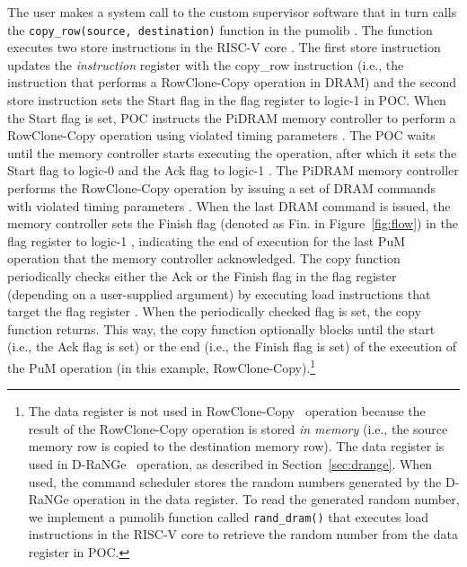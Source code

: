 {{T}he user makes a system call to the custom supervisor software  that in turn calls the {\texttt{copy\_row(source, destination)}} function in the {pumolib} . The function executes {two} store instructions in the RISC-V core . {The first store} instruction {update{s}} the \emph{instruction} register with the {copy\_row} instruction (i.e., the instruction that performs a {RowClone-Copy} operation in DRAM)  and {the second store instruction} {set{s} the Start flag in the flag register to logic-1  in POC.} {When the Start flag is set,} POC instructs the PiDRAM memory controller to perform a {RowClone-Copy} operation using violated timing parameters . {{T}he {POC waits until the memory controller starts executing the {operation, after which it}} sets the Start flag to logic-0 and the Ack {flag} to logic-1 .} {T}he PiDRAM memory controller performs the {RowClone-Copy} operation by issuing a set of DRAM commands with violated timing parameters . {{When the last DRAM command is issued, the memory controller} sets the Finish flag (denoted as Fin. in Figure~\ref{fig:flow}) in the flag register to logic-1 , indicating the end of execution for the last PuM operation that the memory controller acknowledged.} {The copy function periodically checks {either} the Ack {or the} Finish flag in the flag register {(depending on a user-supplied argument)} by executing load instructions that target the flag register . {When the periodically checked flag is set, the copy function returns.} This way, the copy function optionally blocks until the start {(i.e., the Ack flag is set)} or the end {(i.e., the Finish flag is set)} of the execution of the PuM operation (in this example, RowClone-Copy).\footnote{{The data register is not used in  RowClone-Copy~\cite{seshadri2013rowclone} operation because the result of the RowClone-Copy operation is stored {\emph{in memory}} (i.e., the source {memory row} is copied to the destination {memory row}). The data register is used in  D-RaNGe~\cite{kim.hpca19} operation{, as described in Section~\ref{sec:drange}}. {When used, t}he command scheduler store{s} the random numbers generated by {the} D-RaNGe operation in the data register. To read the generated random number, we implement a pumolib function {called} \texttt{rand\_dram()} that executes load instructions in the {RISC-V} core to retrieve the random number from the data register in POC.}}}}


